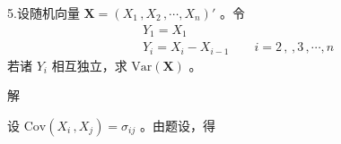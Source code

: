 \documentclass[12pt,hyperref,]{ctexart}
\begin{document}
\vspace{3em}

\kaishu

5.设随机向量 \(\mathbf{X}=(X_1\, ,X_2\, ,\cdots ,X_n)'\) 。令
\begin{equation*}
\begin{aligned}
& Y_1=X_1 \\
& Y_i=X_i-X_{i-1}\qquad i=2\, ,\, ,3\, ,\cdots ,n
\end{aligned}
\end{equation*}若诸 \(Y_i\) 相互独立，求 \(\mathrm{Var}(\mathbf{X})\) 。

\vspace{1em}

\heiti

解

\songti

设 \(\mathrm{Cov}(X_i\, ,X_j)=\sigma_{ij}\) 。由题设，得
\end{document}
